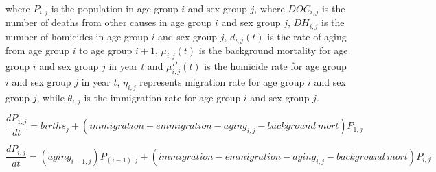 \documentclass[
]{jss}
\begin{document}
where \(P_{i, j}\) is the population in age group \(i\) and sex group
\(j\), where \(DOC_{i, j}\) is the number of deaths from other causes in
age group \(i\) and sex group \(j\), \(DH_{i, j}\) is the number of
homicides in age group \(i\) and sex group \(j\), \(d_{i, j}(t)\) is the
rate of aging from age group \(i\) to age group \(i+1\),
\(\mu_{i, j}(t)\) is the background mortality for age group \(i\) and
sex group \(j\) in year \(t\) and \(\mu_{i, j}^{H}(t)\) is the homicide
rate for age group \(i\) and sex group \(j\) in year \(t\),
\(\eta_{i, j}\) represents migration rate for age group \(i\) and sex
group \(j\), while \(\theta_{i, j}\) is the immigration rate for age
group \(i\) and sex group \(j\).

\[\frac{dP_{1, j}}{dt} = births_j + (immigration - emmigration - aging_{i, j} -  background\ mort)P_{1,j}\]

\[\frac{dP_{i, j}}{dt} = (aging_{i-1, j})P_{(i-1), j} + (immigration - emmigration - aging_{i,j} - background\ mort)P_{i,j}\]
\end{document}
